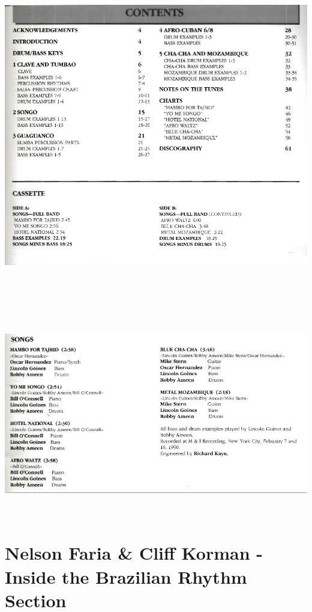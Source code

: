 \documentclass[a4paper]{book}
\begin{document}
\begin{center}
\includegraphics[width=17cm,height=14.61cm]{lebluessupportsmethodes-img168.png}
\end{center}
\begin{center}
\includegraphics[width=17cm,height=8.939cm]{lebluessupportsmethodes-img169.png}
\end{center}
\clearpage\section{Nelson Faria \& Cliff Korman - Inside the
Brazilian Rhythm Section}
\end{document}
